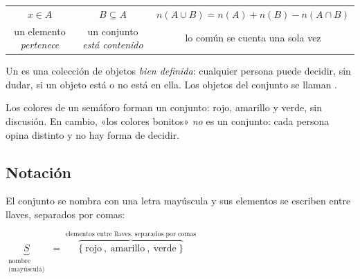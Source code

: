 \documentclass[11pt,a4paper]{article}
\begin{document}

\begin{clavebox}
\renewcommand{\arraystretch}{1.5}\begin{tabular}{@{}c@{\qquad}c@{\qquad}c@{}}
$x\in A$ & $B\subseteq A$ & $n(A\cup B)=n(A)+n(B)-n(A\cap B)$\\[2pt]
\small un elemento \emph{pertenece} & \small un conjunto \emph{está contenido} & \small lo común se cuenta una sola vez
\end{tabular}
\end{clavebox}


\begin{definicion}
Un  es una colección de objetos \emph{bien definida}: cualquier persona puede decidir, sin dudar,
si un objeto está o no está en ella. Los objetos del conjunto se llaman .
\end{definicion}

Los colores de un semáforo forman un conjunto: rojo, amarillo y verde, sin discusión. En cambio,
«los colores bonitos» \emph{no} es un conjunto: cada persona opina distinto y no hay forma de decidir.

\subsection{Notación}
El conjunto se nombra con una letra mayúscula y sus elementos se escriben entre llaves, separados por comas:
\begin{figura}
\large
$\displaystyle
\underbrace{S}_{\substack{\text{nombre}\\ \text{(mayúscula)}}}
\;=\;
\overbrace{\Big\{\ \text{rojo}\ ,\ \text{amarillo}\ ,\ \text{verde}\ \Big\}}^{\text{elementos entre llaves, separados por comas}}$
\end{figura}
\end{document}
